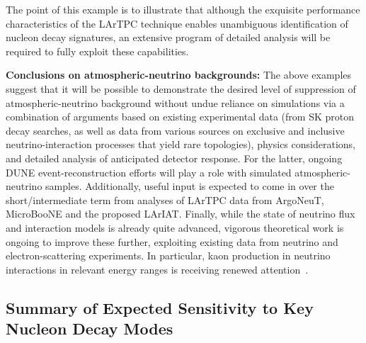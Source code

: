 The point of this example is to illustrate that although the 
exquisite performance characteristics of the LArTPC technique 
enables unambiguous identification of nucleon decay signatures, 
an extensive program of detailed analysis will be required 
to fully exploit these capabilities.

\textbf{Conclusions on atmospheric-neutrino backgrounds:}
The above examples suggest that it will be possible to demonstrate 
the desired level of suppression of atmospheric-neutrino background 
without undue reliance on simulations 
via a combination of arguments based on existing experimental data 
(from SK proton decay searches, as well as data from various 
sources on exclusive and inclusive neutrino-interaction processes 
that yield rare topologies), physics considerations, and detailed 
analysis of anticipated detector response.  For the latter, 
ongoing DUNE event-reconstruction efforts will play a role with 
simulated atmospheric-neutrino samples.  Additionally, useful 
input is expected to come in over the short/intermediate term 
from analyses of LArTPC data from ArgoNeuT, MicroBooNE and 
the proposed LArIAT.
Finally, while the state of neutrino flux and interaction models 
is already quite advanced, vigorous theoretical work is ongoing 
to improve these further, exploiting existing data from neutrino 
and electron-scattering experiments.  In particular, kaon production 
in neutrino interactions in relevant energy ranges is receiving 
renewed attention~\cite{gallagher-private}.
\clearpage
\subsection{\boldmath Summary of Expected Sensitivity to Key Nucleon Decay Modes}

